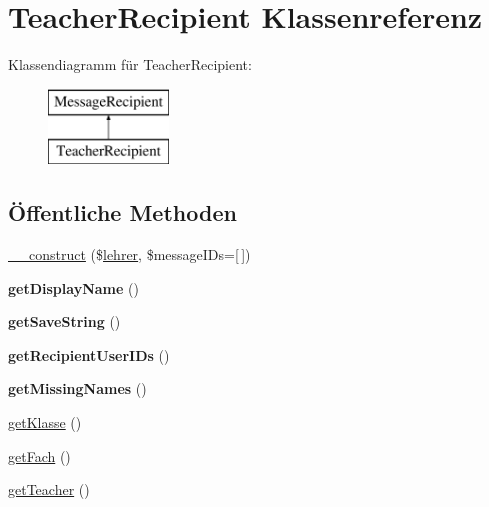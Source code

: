 \hypertarget{class_teacher_recipient}{}\section{Teacher\+Recipient Klassenreferenz}
\label{class_teacher_recipient}
Klassendiagramm für Teacher\+Recipient\+:\begin{figure}[H]
\begin{center}
\leavevmode
\includegraphics[height=2.000000cm]{class_teacher_recipient}
\end{center}
\end{figure}
\subsection*{Öffentliche Methoden}
\begin{DoxyCompactItemize}
\item 
\mbox{\hyperlink{class_teacher_recipient_af12d98b70897c09951b8dd6f27411abe}{\+\_\+\+\_\+construct}} (\$\mbox{\hyperlink{classlehrer}{lehrer}}, \$message\+I\+Ds=\mbox{[}$\,$\mbox{]})
\item 
\mbox{\label{class_teacher_recipient_a55c87462b1dfb303fd9d84550907d11e}} 
{\bfseries get\+Display\+Name} ()
\item 
\mbox{\label{class_teacher_recipient_aa99b12a238deb8db0107785c7b9d8ad4}} 
{\bfseries get\+Save\+String} ()
\item 
\mbox{\label{class_teacher_recipient_a489ee9af2e3aa6f1a84b2a8050fa63d4}} 
{\bfseries get\+Recipient\+User\+I\+Ds} ()
\item 
\mbox{\label{class_teacher_recipient_a2719c77cca37b1601acf5ba2e3f33676}} 
{\bfseries get\+Missing\+Names} ()
\item 
\mbox{\hyperlink{class_teacher_recipient_a3dc7bf504e6df3b181cc483b92203a9e}{get\+Klasse}} ()
\item 
\mbox{\hyperlink{class_teacher_recipient_ab837a1b7c4f59b9b4222b74f135534b5}{get\+Fach}} ()
\item 
\mbox{\hyperlink{class_teacher_recipient_a55d2bb119c0c9b33d71abad8b02a6557}{get\+Teacher}} ()
\end{DoxyCompactItemize}
